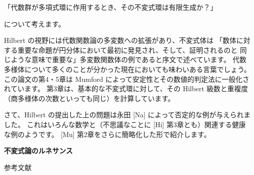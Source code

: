 \documentclass[uplatex,dvipdfmx]{jlreq}
\begin{document}
\medskip
\begin{center}
  「代数群が多項式環に作用するとき、その不変式環は有限生成か？」
\end{center}
\medskip

\noindent
について考えます。

Hilbert の視野には代数関数論の多変数への拡張があり、不変式体は
「数体に対する重要な命題が円分体において最初に発見され、そして、証明されるのと
同じような意味で重要な」多変数関数体の例であると序文で述べています。
代数多様体について多くのことが分かった現在においても味わいある言葉でしょう。
この論文の第4・5章は Mumford によって安定性とその数値的判定法に一般化されています。
第3章は、基本的な不変式環に対して、その Hilbert 級数と重複度
（商多様体の次数といっても同じ）を計算しています。

さて、Hilbert の提出した上の問題は永田 [Na] によって否定的な例が与えられました。
これはいろんな数学と（不思議なことに [Hi] 第3章とも）関連する健康な例のようです。
[Mu] 第2章をさらに簡略化した形で紹介します。

\newpage

\begin{center}
  {\large\bfseries 不変式論のルネサンス}
\end{center}

\begin{center}
  \textsc{参考文献}
\end{center}
\end{document}
